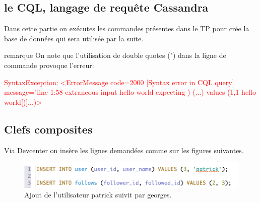 \subsection{le CQL, langage de requête Cassandra}

\par Dans cette partie on exécutes les commandes présentes dans le TP pour crée la base de données
qui sera utilisée par la suite.
\begin{block}{remarque}
On note que l\rq utilisation de double quotes (") dans la ligne de commande provoque l'erreur: \newline
\begin{tt}
\textcolor{red}{
SyntaxException: <ErrorMessage code=2000 [Syntax error in CQL query]
message="line 1:58 extraneous input hello world expecting ) (...) values (1,1 hello world[)]...)>
}
\end{tt}
\end{block}

\subsection{Clefs composites}
Via Devcenter on insère les lignes demandées comme sur les figures suivantes. \newline
\begin{figure}[h!]
\centering
\includegraphics[scale=0.7]{img/add_patrick.png}
\caption{Ajout de l'utilisateur patrick suivit par georges.}
\end{figure}


